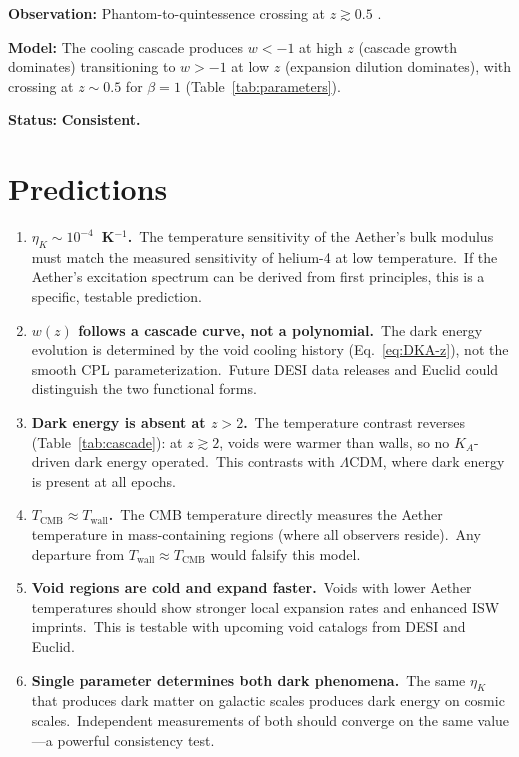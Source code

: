 \documentclass[12pt,letterpaper]{article}
\newcommand{\Ka}{K_{\!A}}
\newcommand{\etaK}{\eta_{\!K}}
\begin{document}
\textbf{Observation:} Phantom-to-quintessence crossing at $z \gtrsim 0.5$
\cite{desi2025}.

\textbf{Model:} The cooling cascade produces $w < -1$ at high $z$ (cascade
growth dominates) transitioning to $w > -1$ at low $z$ (expansion dilution
dominates), with crossing at $z \sim 0.5$ for $\beta = 1$
(Table~\ref{tab:parameters}).

\textbf{Status:} \textbf{Consistent.}


\section{Predictions}
\label{sec:predictions}

\begin{enumerate}[leftmargin=2em]
  \item \textbf{$\etaK \sim 10^{-4}$~K$^{-1}$.}\ The temperature
    sensitivity of the Aether's bulk modulus must match the measured
    sensitivity of helium-4 at low temperature.\ If the Aether's excitation
    spectrum can be derived from first principles, this is a specific,
    testable prediction.

  \item \textbf{$w(z)$ follows a cascade curve, not a polynomial.}\ The
    dark energy evolution is determined by the void cooling history
    (Eq.~\ref{eq:DKA-z}), not the smooth CPL parameterization.\ Future
    DESI data releases and Euclid could distinguish the two functional
    forms.

  \item \textbf{Dark energy is absent at $z > 2$.}\ The temperature
    contrast reverses (Table~\ref{tab:cascade}): at $z \gtrsim 2$, voids
    were warmer than walls, so no $\Ka$-driven dark energy operated.\ This
    contrasts with $\Lambda$CDM, where dark energy is present at all epochs.

  \item \textbf{$T_{\mathrm{CMB}} \approx T_{\mathrm{wall}}$.}\ The CMB
    temperature directly measures the Aether temperature in mass-containing
    regions (where all observers reside).\ Any departure from
    $T_{\mathrm{wall}} \approx T_{\mathrm{CMB}}$ would falsify this model.

  \item \textbf{Void regions are cold and expand faster.}\ Voids with
    lower Aether temperatures should show stronger local expansion rates and
    enhanced ISW imprints.\ This is testable with upcoming void catalogs
    from DESI and Euclid.

  \item \textbf{Single parameter determines both dark phenomena.}\ The same
    $\etaK$ that produces dark matter on galactic scales produces dark energy
    on cosmic scales.\ Independent measurements of both should converge on
    the same value---a powerful consistency test.
\end{enumerate}
\end{document}
